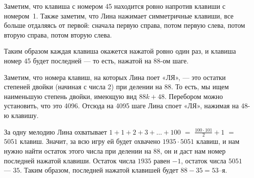 ﻿
\begin{itemize}

\itA Заметим, что клавиша с номером 45 находится ровно напротив клавиши с номером~1. Также заметим, что Лина нажимает симметричные клавиши, все больше отдаляясь от первой: сначала первую справа, потом первую слева, потом вторую справа, потом вторую слева.

Таким образом каждая клавиша окажется нажатой ровно один раз, и клавиша номер 45 будет последней — то есть, нажатой на 88-ом шаге.

\itB Заметим, что номера клавиш, на которых Лина поет «ЛЯ», — это остатки степеней двойки (начиная с числа 2) при делении на 88. То есть, мы ищем наименьшую степень двойки, имеющую вид $88k+48$. Перебором можно установить, что это 4096. Отсюда на 4095 шаге Лина споет «ЛЯ», нажимая на 48-ю клавишу.

\itC За одну мелодию Лина охватывает $1+1+2+3+\ldots+100$ $=$ $\frac{100 \cdot 101}{2} + 1$ $=$ $5051$ клавиш. Значит, за всю игру ей будет охвачено $1935 \cdot 5051$ клавиш, и нам нужно найти остаток этого числа при делении на 88, он и даст нам номер последней нажатой клавиши. Остаток числа $1935$ равен $-1$, остаток числа $5051$ — $35$. Таким образом, последней нажатой клавишей будет $88-35=53$--я.
\end{itemize}